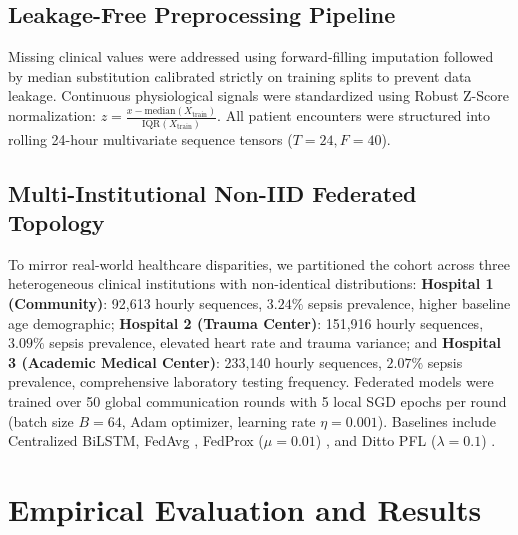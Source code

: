 \documentclass{llncs}
\begin{document}
\subsection{Leakage-Free Preprocessing Pipeline}
Missing clinical values were addressed using forward-filling imputation followed by median substitution calibrated strictly on training splits to prevent data leakage. Continuous physiological signals were standardized using Robust Z-Score normalization: $z = \frac{x - \text{median}(X_{\text{train}})}{\text{IQR}(X_{\text{train}})}$. All patient encounters were structured into rolling 24-hour multivariate sequence tensors ($T=24, F=40$).

\subsection{Multi-Institutional Non-IID Federated Topology}
To mirror real-world healthcare disparities, we partitioned the cohort across three heterogeneous clinical institutions with non-identical distributions: \textbf{Hospital 1 (Community)}: 92,613 hourly sequences, $3.24\%$ sepsis prevalence, higher baseline age demographic; \textbf{Hospital 2 (Trauma Center)}: 151,916 hourly sequences, $3.09\%$ sepsis prevalence, elevated heart rate and trauma variance; and \textbf{Hospital 3 (Academic Medical Center)}: 233,140 hourly sequences, $2.07\%$ sepsis prevalence, comprehensive laboratory testing frequency. Federated models were trained over 50 global communication rounds with 5 local SGD epochs per round (batch size $B=64$, Adam optimizer, learning rate $\eta = 0.001$). Baselines include Centralized BiLSTM, FedAvg \cite{mcmahan2017}, FedProx ($\mu = 0.01$) \cite{liu2022}, and Ditto PFL ($\lambda = 0.1$) \cite{wang2025personalized}.

\section{Empirical Evaluation and Results}
\label{sec:results}
\end{document}
